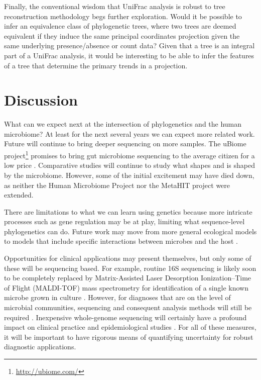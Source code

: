 \documentclass{amsart}
\begin{document}
Finally, the conventional wisdom that UniFrac analysis is robust to tree reconstruction methodology begs further exploration.
Would it be possible to infer an equivalence class of phylogenetic trees, where two trees are deemed equivalent if they induce the same principal coordinates projection given the same underlying presence/absence or count data?
Given that a tree is an integral part of a UniFrac analysis, it would be interesting to be able to infer the features of a tree that determine the primary trends in a projection.


\section{Discussion}
What can we expect next at the intersection of phylogenetics and the human microbiome?
At least for the next several years we can expect more related work.
Future will continue to bring deeper sequencing on more samples.
The uBiome project\footnote{\url{http://ubiome.com/}} promises to bring gut microbiome sequencing to the average citizen for a low price \citep{costandi2013citizen}.
Comparative studies will continue to study what shapes and is shaped by the microbiome.
However, some of the initial excitement may have died down, as neither the Human Microbiome Project nor the MetaHIT project were extended.

There are limitations to what we can learn using genetics because more intricate processes such as gene regulation may be at play, limiting what sequence-level phylogenetics can do.
Future work may move from more general ecological models to models that include specific interactions between microbes and the host \citep[reviewed in][]{hooper2012interactions}.

Opportunities for clinical applications may present themselves, but only some of these will be sequencing based.
For example, routine 16S sequencing is likely soon to be completely replaced by Matrix-Assisted Laser Desorption Ionization--Time of Flight (MALDI-TOF) mass spectrometry for identification of a single known microbe grown in culture \citep{clark2013matrix}.
However, for diagnoses that are on the level of microbial communities, sequencing and consequent analysis methods will still be required \citep[see review in][]{Rogers2013271}.
Inexpensive whole-genome sequencing will certainly have a profound impact on clinical practice and epidemiological studies \citep{didelot2012transforming}.
For all of these measures, it will be important to have rigorous means of quantifying uncertainty for robust diagnostic applications.
\end{document}
